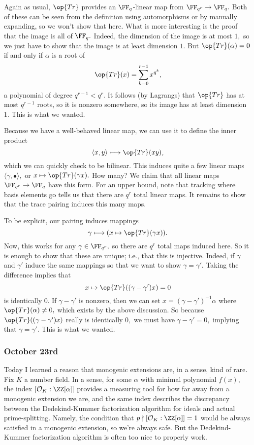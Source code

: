 Again as usual, $\op{Tr}$ provides an $\FF_q$-linear map from $\FF_{q^r}\to\FF_q.$ Both of these can be seen from the definition using automorphisms or by manually expanding, so we won't show that here. What is more interesting is the proof that the image is all of $\FF_q.$ Indeed, the dimension of the image is at most $1,$ so we just have to show that the image is at least dimension $1.$ But $\op{Tr}(\alpha)=0$ if and only if $\alpha$ is a root of
\[\op{Tr}(x)=\sum_{k=0}^{r-1}x^{q^k},\]
a polynomial of degree $q^{r-1}<q^r.$ It follows (by Lagrangs) that $\op{Tr}$ has at most $q^{r-1}$ roots, so it is nonzero somewhere, so its image has at least dimension $1.$ This is what we wanted.

Because we have a well-behaved linear map, we can use it to define the inner product
\[\langle x,y\rangle\longmapsto\op{Tr}(xy),\]
which we can quickly check to be bilinear. This induces quite a few linear maps $\langle\gamma,\bullet\rangle,$ or $x\mapsto\op{Tr}(\gamma x).$ How many? We claim that all linear maps $\FF_{q^r}\to\FF_q$ have this form. For an upper bound, note that tracking where basis elements go tells us that there are $q^r$ total linear maps. It remains to show that the trace pairing induces this many maps.

To be explicit, our pairing induces mappings
\[\gamma\longmapsto(x\mapsto\op{Tr}(\gamma x)).\]
Now, this works for any $\gamma\in\FF_{q^r},$ so there are $q^r$ total maps induced here. So it is enough to show that these are unique; i.e., that this is injective. Indeed, if $\gamma$ and $\gamma'$ induce the same mappings so that we want to show $\gamma=\gamma'.$ Taking the difference implies that
\[x\mapsto\op{Tr}((\gamma-\gamma')x)=0\]
is identically $0.$ If $\gamma-\gamma'$ is nonzero, then we can set $x=(\gamma-\gamma')^{-1}\alpha$ where $\op{Tr}(\alpha)\ne0,$ which exists by the above discussion. So because $\op{Tr}((\gamma-\gamma')x)$ really is identically $0,$ we must have $\gamma-\gamma'=0,$ implying that $\gamma=\gamma'.$ This is what we wanted.

\subsubsection{October 23rd}
Today I learned a reason that monogenic extensions are, in a sense, kind of rare. Fix $K$ a number field. In a sense, for some $\alpha$ with minimal polynomial $f(x),$ the index $[\mathcal O_K:\ZZ[\alpha]]$ provides a measuring tool for how far away from a monogenic extension we are, and the same index describes the discrepancy between the Dedekind-Kummer factorization algorithm for ideals and actual prime-splitting. Namely, the condition that $p\nmid[\mathcal O_K:\ZZ[\alpha]]=1$ would be always satisfied in a monogenic extension, so we're always safe. But the Dedekind-Kummer factorization algorithm is often too nice to properly work.


